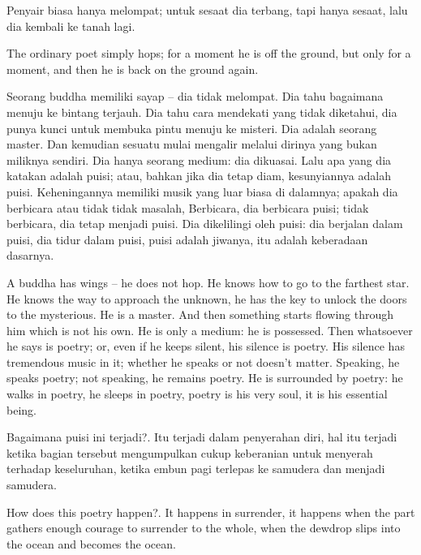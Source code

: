 \bahasa
Penyair biasa hanya melompat; untuk sesaat dia terbang, tapi hanya sesaat, lalu dia kembali ke tanah lagi.

\english
The ordinary poet simply hops; for a moment he is off the ground, but only for a moment, and then he is back on the ground again.

\bahasa
Seorang buddha memiliki sayap -- dia tidak melompat. Dia tahu bagaimana menuju ke bintang terjauh. Dia tahu cara mendekati yang tidak diketahui, dia punya kunci untuk membuka pintu menuju ke misteri. Dia adalah seorang master. Dan kemudian sesuatu mulai mengalir melalui dirinya yang bukan miliknya sendiri. Dia hanya seorang medium: dia dikuasai. Lalu apa yang dia katakan adalah puisi; atau, bahkan jika dia tetap diam, kesunyiannya adalah puisi. Keheningannya memiliki musik yang luar biasa di dalamnya; apakah dia berbicara atau tidak tidak masalah, Berbicara, dia berbicara puisi; tidak berbicara, dia tetap menjadi puisi. Dia dikelilingi oleh puisi: dia berjalan dalam puisi, dia tidur dalam puisi, puisi adalah jiwanya, itu adalah keberadaan dasarnya.

\english
A buddha has wings -- he does not hop. He knows how to go to the farthest star. He knows the way to approach the unknown, he has the key to unlock the doors to the mysterious. He is a master. And then something starts flowing through him which is not his own. He is only a medium: he is possessed. Then whatsoever he says is poetry; or, even if he keeps silent, his silence is poetry. His silence has tremendous music in it; whether he speaks or not doesn't matter. Speaking, he speaks poetry; not speaking, he remains poetry. He is surrounded by poetry: he walks in poetry, he sleeps in poetry, poetry is his very soul, it is his essential being.

\bahasa
Bagaimana puisi ini terjadi?. Itu terjadi dalam penyerahan diri, hal itu terjadi ketika bagian tersebut mengumpulkan cukup keberanian untuk menyerah terhadap keseluruhan, ketika embun pagi terlepas ke samudera dan menjadi samudera.

\english
How does this poetry happen?. It happens in surrender, it happens when the part gathers enough courage to surrender to the whole, when the dewdrop slips into the ocean and becomes the ocean.



